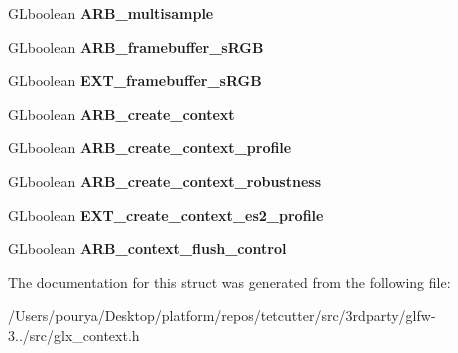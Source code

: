 \begin{DoxyCompactItemize}
\item 
\hypertarget{struct__GLFWlibraryGLX_a4230ebc064c78ac1d109bc65d2576118}{}G\+Lboolean {\bfseries A\+R\+B\+\_\+multisample}\label{struct__GLFWlibraryGLX_a4230ebc064c78ac1d109bc65d2576118}

\item 
\hypertarget{struct__GLFWlibraryGLX_abf73dff8743fa2436bee7ebf2fa459f0}{}G\+Lboolean {\bfseries A\+R\+B\+\_\+framebuffer\+\_\+s\+R\+G\+B}\label{struct__GLFWlibraryGLX_abf73dff8743fa2436bee7ebf2fa459f0}

\item 
\hypertarget{struct__GLFWlibraryGLX_ad56ae866a4a7271b072e7e08dcb4f0f0}{}G\+Lboolean {\bfseries E\+X\+T\+\_\+framebuffer\+\_\+s\+R\+G\+B}\label{struct__GLFWlibraryGLX_ad56ae866a4a7271b072e7e08dcb4f0f0}

\item 
\hypertarget{struct__GLFWlibraryGLX_ae147dbaab1116a0dca210cb3418a83de}{}G\+Lboolean {\bfseries A\+R\+B\+\_\+create\+\_\+context}\label{struct__GLFWlibraryGLX_ae147dbaab1116a0dca210cb3418a83de}

\item 
\hypertarget{struct__GLFWlibraryGLX_ab6a469fe9e7d90bc69dd117404b52fb4}{}G\+Lboolean {\bfseries A\+R\+B\+\_\+create\+\_\+context\+\_\+profile}\label{struct__GLFWlibraryGLX_ab6a469fe9e7d90bc69dd117404b52fb4}

\item 
\hypertarget{struct__GLFWlibraryGLX_abafd10bf84fc6df737145cee7db5e19c}{}G\+Lboolean {\bfseries A\+R\+B\+\_\+create\+\_\+context\+\_\+robustness}\label{struct__GLFWlibraryGLX_abafd10bf84fc6df737145cee7db5e19c}

\item 
\hypertarget{struct__GLFWlibraryGLX_a5e7b892d296dc63b6f7484a4e8a51e21}{}G\+Lboolean {\bfseries E\+X\+T\+\_\+create\+\_\+context\+\_\+es2\+\_\+profile}\label{struct__GLFWlibraryGLX_a5e7b892d296dc63b6f7484a4e8a51e21}

\item 
\hypertarget{struct__GLFWlibraryGLX_aab051a37df36274c030d3c02152b641b}{}G\+Lboolean {\bfseries A\+R\+B\+\_\+context\+\_\+flush\+\_\+control}\label{struct__GLFWlibraryGLX_aab051a37df36274c030d3c02152b641b}

\end{DoxyCompactItemize}


The documentation for this struct was generated from the following file\+:\begin{DoxyCompactItemize}
\item 
/\+Users/pourya/\+Desktop/platform/repos/tetcutter/src/3rdparty/glfw-\/3../src/glx\+\_\+context.\+h\end{DoxyCompactItemize}

